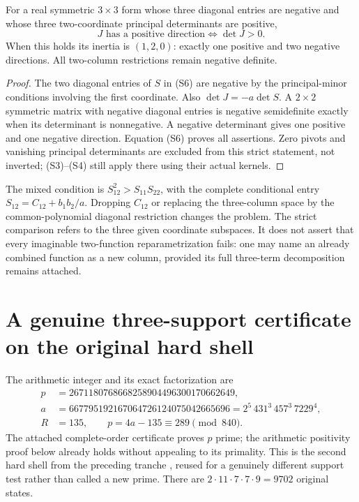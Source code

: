 \begin{theorem}
For a real symmetric $3\times3$ form whose three diagonal entries are negative
and whose three two-coordinate principal determinants are positive,
\[
 \boxed{J\text{ has a positive direction}\iff\det J>0.}
 \tag{S7}
\]
When this holds its inertia is $(1,2,0)$: exactly one positive and two negative
directions. All two-column restrictions remain negative definite.
\end{theorem}
\begin{proof}
The two diagonal entries of $S$ in (S6) are negative by the principal-minor
conditions involving the first coordinate. Also $\det J=-a\det S$.
A $2\times2$ symmetric matrix with negative diagonal entries is negative
semidefinite exactly when its determinant is nonnegative. A negative
determinant gives one positive and one negative direction. Equation (S6)
proves all assertions. Zero pivots and vanishing principal determinants are
excluded from this strict statement, not inverted; (S3)--(S4) still apply
there using their actual kernels.
\end{proof}

The mixed condition is $S_{12}^2>S_{11}S_{22}$, with the complete conditional
entry $S_{12}=C_{12}+b_1b_2/a$. Dropping $C_{12}$ or replacing the three-column
space by the common-polynomial diagonal restriction changes the problem.
The strict comparison refers to the three given coordinate subspaces.
It does not assert that every imaginable two-function reparametrization fails:
one may name an already combined function as a new column, provided its full
three-term decomposition remains attached.

\section{A genuine three-support certificate on the original hard shell}
The arithmetic integer and its exact factorization are
\[
\begin{split}
 p&=2671180768668258904496300170662649,\\
 a&=667795192167064726124075042665696
     =2^5\,431^3\,457^3\,7229^4,\\
 R&=135,
 \qquad p=4a-135\equiv289\pmod{840}.
\end{split}\tag{E1}
\]
The attached complete-order certificate proves $p$ prime; the arithmetic
positivity proof below already holds without appealing to its primality.
This is the second hard shell from the preceding tranche \cite{Prior}, reused
for a genuinely different support test rather than called a new prime.
There are $2\cdot11\cdot7\cdot7\cdot9=9702$ original states.

